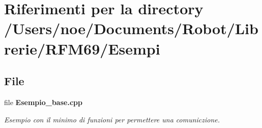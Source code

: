 \section{Riferimenti per la directory /\+Users/noe/\+Documents/\+Robot/\+Librerie/\+R\+F\+M69/\+Esempi}
\label{dir_2392674369b09c96346233c031ed41d8}
\subsection*{File}
\begin{DoxyCompactItemize}
\item 
file \textbf{ Esempio\+\_\+base.\+cpp}
\begin{DoxyCompactList}\small\item\em Esempio con il minimo di funzioni per permettere una comuniczione. \end{DoxyCompactList}\end{DoxyCompactItemize}
